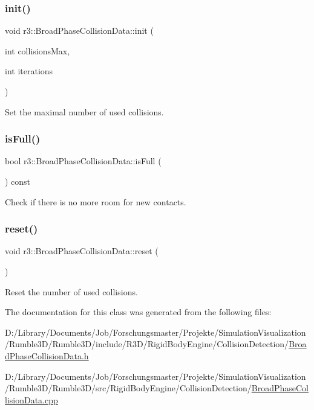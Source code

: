 \subsubsection{\texorpdfstring{init()}{init()}}
{\footnotesize\ttfamily void r3\+::\+Broad\+Phase\+Collision\+Data\+::init (\begin{DoxyParamCaption}\item[{int}]{collisions\+Max,  }\item[{int}]{iterations }\end{DoxyParamCaption})}

Set the maximal number of used collisions. \mbox{\label{classr3_1_1_broad_phase_collision_data_a2a553a4971808f372fc4511bdcd8797c}} 
\subsubsection{\texorpdfstring{is\+Full()}{isFull()}}
{\footnotesize\ttfamily bool r3\+::\+Broad\+Phase\+Collision\+Data\+::is\+Full (\begin{DoxyParamCaption}{ }\end{DoxyParamCaption}) const}

Check if there is no more room for new contacts. \mbox{\label{classr3_1_1_broad_phase_collision_data_a258a014684e0c480929e8980a40a5ab9}} 
\subsubsection{\texorpdfstring{reset()}{reset()}}
{\footnotesize\ttfamily void r3\+::\+Broad\+Phase\+Collision\+Data\+::reset (\begin{DoxyParamCaption}{ }\end{DoxyParamCaption})}

Reset the number of used collisions. 

The documentation for this class was generated from the following files\+:\begin{DoxyCompactItemize}
\item 
D\+:/\+Library/\+Documents/\+Job/\+Forschungsmaster/\+Projekte/\+Simulation\+Visualization/\+Rumble3\+D/\+Rumble3\+D/include/\+R3\+D/\+Rigid\+Body\+Engine/\+Collision\+Detection/\mbox{\hyperlink{_broad_phase_collision_data_8h}{Broad\+Phase\+Collision\+Data.\+h}}\item 
D\+:/\+Library/\+Documents/\+Job/\+Forschungsmaster/\+Projekte/\+Simulation\+Visualization/\+Rumble3\+D/\+Rumble3\+D/src/\+Rigid\+Body\+Engine/\+Collision\+Detection/\mbox{\hyperlink{_broad_phase_collision_data_8cpp}{Broad\+Phase\+Collision\+Data.\+cpp}}\end{DoxyCompactItemize}
